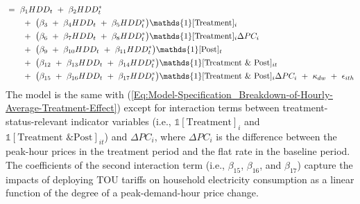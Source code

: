 \begin{equation}
\begin{split}
    & = \ \beta_{1} HDD_{t} \ + \ \beta_{2} HDD_{t}^{*} \\
    & \hspace{0.7cm} + \ \big( \beta_{3} \ + \ \beta_{4} HDD_{t} \ + \ \beta_{5} HDD_{t}^{*} \big) \mathds{1}[\text{Treatment}]_{i} \\
    & \hspace{0.7cm} + \ \big( \beta_{6} \ + \ \beta_{7} HDD_{t} \ + \ \beta_{8} HDD_{t}^{*} \big) \mathds{1}[\text{Treatment}]_{i} \Delta PC_{i} \\
    & \hspace{0.7cm} + \ \big( \beta_{9} \ + \ \beta_{10} HDD_{t} \ + \ \beta_{11} HDD_{t}^{*} \big) \mathds{1}[\text{Post}]_{t} \\
    & \hspace{0.7cm} + \ \big( \beta_{12} \ + \ \beta_{13} HDD_{t} \ + \ \beta_{14} HDD_{t}^{*} \big) \mathds{1}[\text{Treatment \& Post}]_{it} \\
    & \hspace{0.7cm} + \ \big( \beta_{15} \ + \ \beta_{16} HDD_{t} \ + \ \beta_{17} HDD_{t}^{*} \big) \mathds{1}[\text{Treatment \& Post}]_{i} \Delta PC_{i} \ + \ \kappa_{dw} \ + \ \epsilon_{ith}
\end{split}
\label{Eq:Model-Specification_Breakdown-of-Hourly-Average-Treatment-Effect-as-a-Linear-Function-of-Price-Changes}
\end{equation}
The model is the same with (\ref{Eq:Model-Specification_Breakdown-of-Hourly-Average-Treatment-Effect}) except for interaction terms between treatment-status-relevant indicator variables (i.e., $\mathds{1}[\text{Treatment}]_{i}$ and $\mathds{1}[\text{Treatment \& Post}]_{it}$) and $\Delta PC_{i}$, where $\Delta PC_{i}$ is the difference between the peak-hour prices in the treatment period and the flat rate in the baseline period. The coefficients of the second interaction term (i.e., $\beta_{15}$, $\beta_{16}$, and $\beta_{17}$) capture the impacts of deploying TOU tariffs on household electricity consumption as a linear function of the degree of a peak-demand-hour price change. 

